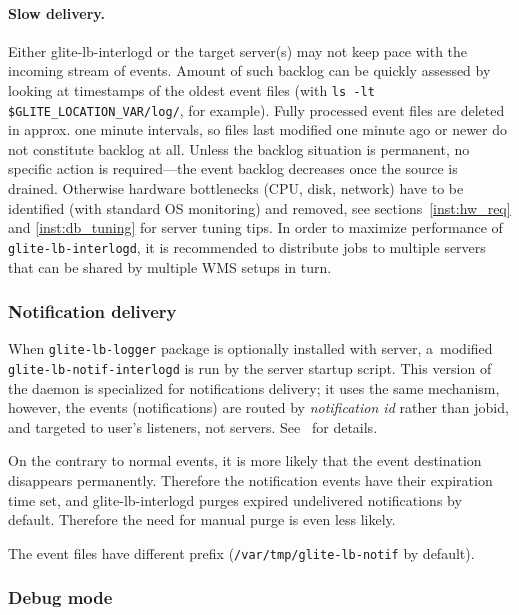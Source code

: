 \paragraph{Slow delivery.}
Either glite-lb-interlogd or the target \LB server(s) may not keep pace 
with the incoming stream of events. 
Amount of such backlog can be quickly assessed by looking at timestamps of the oldest
event files (with \verb'ls -lt $GLITE_LOCATION_VAR/log/', for example). 
Fully processed event files are deleted in approx. one minute intervals, 
so files last modified one minute ago or newer do not constitute backlog at all.
Unless the backlog situation is permanent, no specific action is required---the 
event backlog decreases once the source is drained.
Otherwise hardware bottlenecks (CPU, disk, network) have to be identified
(with standard OS monitoring) and removed, see sections~\ref{inst:hw_req} and
\ref{inst:db_tuning} for \LB server tuning tips. In order to maximize 
performance of \verb'glite-lb-interlogd', it is recommended to distribute
jobs to multiple \LB servers that can be shared by multiple WMS setups in turn.

\subsubsection{Notification delivery}
\begin{sloppypar}
When \verb'glite-lb-logger' package is optionally installed with \LB server, 
a~modified \verb'glite-lb-notif-interlogd' is run by the server startup
script.
This version of the daemon is specialized for \LB notifications delivery;
it uses the same mechanism, however, the events (notifications) are routed
by \emph{notification id} rather than jobid, and targeted to user's listeners,
not \LB servers.
See~\cite{lbug, lbdg} for details.
\end{sloppypar}

On the contrary to normal events, it is more likely that the event destination
disappears permanently.
Therefore the notification events have their expiration time set,
and glite-lb-interlogd purges expired undelivered notifications by default.
Therefore the need for manual purge is even less likely.

The event files have different prefix (\verb'/var/tmp/glite-lb-notif' by default).

\subsubsection{Debug mode}

